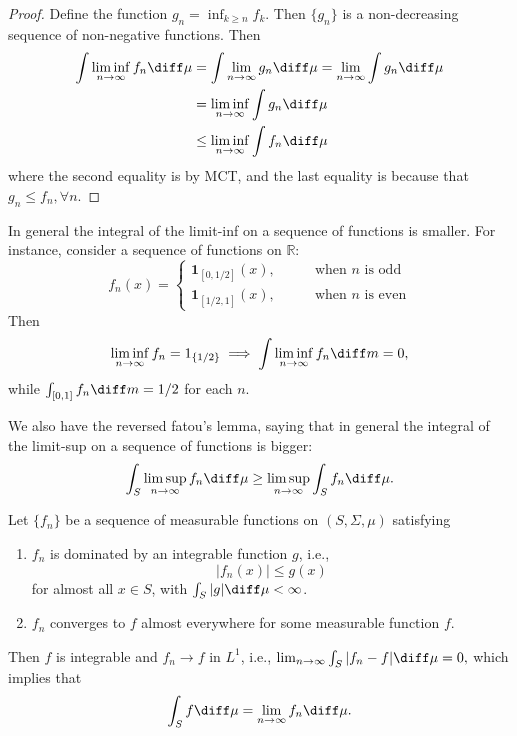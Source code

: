 \begin{proof}
Define the function $g_n = \inf_{k\ge n}f_k$.
Then $\{g_n\}$ is a non-decreasing sequence of non-negative functions.
Then 
\begin{align*}
\int \liminf_{n\to\infty}f_n\diff\mu
&=
\int\lim_{n\to\infty}g_n\diff\mu=
\lim_{n\to\infty}\int g_n\diff\mu\\
&=\liminf_{n\to\infty}\int g_n\diff\mu\\
&\le\liminf_{n\to\infty} \int f_n\diff\mu
\end{align*}
where the second equality is by MCT, and the last equality is because that $g_n\le f_n,\forall n$.
\end{proof}

\begin{example}
In general the integral of the limit-inf on a sequence of functions is smaller.
For instance, consider a sequence of functions on $\mathbb{R}$:
\[
f_n(x)=\left\{
\begin{aligned}
\bm 1_{[0,1/2]}(x),&\qquad\text{when $n$ is odd}\\
\bm1_{[1/2,1]}(x),&\qquad\text{when $n$ is even}
\end{aligned}
\right.
\]
Then 
\[
\liminf_{n\to\infty}f_n=1_{\{1/2\}}\implies
\int\liminf_{n\to\infty}f_n\diff m=0,
\]
while $\int_{[0,1]}f_n\diff m=1/2$ for each $n$.
\end{example}

\begin{remark}
We also have the reversed fatou's lemma, saying that in general the integral of the limit-sup on a sequence of functions is bigger:
\[
\int_S\limsup_{n\to\infty}f_n\diff\mu \ge \limsup_{n\to\infty}\int_Sf_n\diff\mu.
\]
\end{remark}

\begin{theorem}
Let $\{f_n\}$ be a sequence of measurable functions on $(S,\Sigma,\mu)$ satisfying
\begin{enumerate}
\item
$f_n$ is dominated by an integrable function $g$, i.e., 
\[
|f_n(x)|\le g(x)
\]
for almost all $x\in S$, with $\int_S|g|\diff\mu<\infty$.
\item
$f_n$ converges to $f$ almost everywhere for some measurable function $f$.
\end{enumerate}
Then $f$ is integrable and $f_n\to f$ in $L^1$, i.e., 
$
\lim_{n\to\infty}\int_S|f_n-f|\diff\mu=0,
$
which implies that 
\[
\int_Sf\diff\mu = \lim_{n\to\infty}f_n\diff\mu.
\]
\end{theorem}

